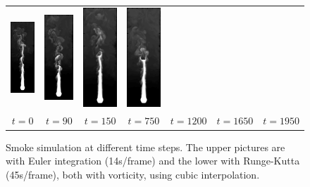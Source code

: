 \documentclass[accepted,single]{gipaper}
\begin{document}
\begin{figure}
\begin{center}
\begin{tabular}{ccccccc}
      \includegraphics[width=0.12\linewidth]{RKI2000linearvort/50.png} & \includegraphics[width=0.12\linewidth]{RKI2000linearvort/80.png} & \includegraphics[width=0.12\linewidth]{RKI2000linearvort/110.png} & 
      \includegraphics[width=0.12\linewidth]{RKI2000linearvort/130.png} \\

      $t = 0$ & $t = 90$ & $t = 150$ & $t = 750$ & $t = 1200$  & $t = 1650$ & $t = 1950$ \\
    \end{tabular}
    \caption{Smoke simulation at different time steps. The upper pictures are with Euler integration (14s/frame) and the lower with Runge-Kutta (45s/frame), both with vorticity, using cubic interpolation.}
    \label{inttest}
  \end{center}
\end{figure}
\end{document}
